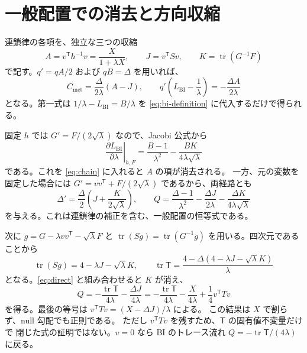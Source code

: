 \documentclass[11pt,a4paper]{article}
\newcommand{\tr}{\operatorname{tr}}
\newcommand{\Tmix}{\mathsf{T}}
\newcommand{\Cmet}{C_{\mathrm{met}}}
\newcommand{\Lbi}{L_{\mathrm{BI}}}
\begin{document}
\newpage
\section{一般配置での消去と方向収縮}
連鎖律の各項を、独立な三つの収縮
\begin{equation}\label{eq:contractions}
A=v^{\mathsf T}h^{-1}v=\frac{X}{1+\lambda X},\qquad
J=v^{\mathsf T}Sv,\qquad K=\tr(G^{-1}F)
\end{equation}
で記す。$q'=qA/2$ および $qB=\Delta$ を用いれば、
\begin{equation}\label{eq:metric-cancellation}
\Cmet=\frac{\Delta}{2\lambda}(A-J),\qquad
q'\left(\Lbi-\frac1\lambda\right)=-\frac{\Delta A}{2\lambda}
\end{equation}
となる。第一式は $1/\lambda-\Lbi=B/\lambda$ を
\eqref{eq:bi-definition} に代入するだけで得られる。

固定 $h$ では $G'=F/(2\sqrt\lambda)$ なので、Jacobi 公式から
\begin{equation}\label{eq:fixed-jacobi}
\left.\frac{\partial\Lbi}{\partial\lambda}\right|_{h,F}
=\frac{B-1}{\lambda^2}-\frac{BK}{4\lambda\sqrt\lambda}
\end{equation}
である。これを \eqref{eq:chain} に入れると $A$ の項が消去される。
一方、元の変数を固定した場合には
$G'=vv^{\mathsf T}+F/(2\sqrt\lambda)$ であるから、両経路とも
\begin{equation}\label{eq:direct}
\Delta'=\frac\Delta2\left(J+\frac{K}{2\sqrt\lambda}\right),
\qquad
Q=\frac{\Delta-1}{\lambda^2}-\frac{\Delta J}{2\lambda}
 -\frac{\Delta K}{4\lambda\sqrt\lambda}
\end{equation}
を与える。これは連鎖律の補正を含む、一般配置の恒等式である。

次に $g=G-\lambda vv^{\mathsf T}-\sqrt\lambda F$ と
$\tr(Sg)=\tr(G^{-1}g)$ を用いる。四次元であることから
\begin{equation}\label{eq:trace}
\tr(Sg)=4-\lambda J-\sqrt\lambda K,\qquad
\tr\Tmix=\frac{4-\Delta(4-\lambda J-\sqrt\lambda K)}{\lambda}
\end{equation}
となる。\eqref{eq:direct} と組み合わせると $K$ が消え、
\begin{equation}\label{eq:main}
\boxed{\displaystyle
Q=-\frac{\tr\Tmix}{4\lambda}-\frac{\Delta J}{4\lambda}
=-\frac{\tr\Tmix}{4\lambda}-\frac{X}{4\lambda}
 +\frac14v^{\mathsf T}Tv }
\end{equation}
を得る。最後の等号は $v^{\mathsf T}Tv=(X-\Delta J)/\lambda$ による。
この結果は $X$ で割らず、null 勾配でも正則である。
ただし $v^{\mathsf T}Tv$ を残すため、$\Tmix$ の固有値不変量だけで
閉じた式の証明ではない。$v=0$ なら BI のトレース流れ
$Q=-\tr\Tmix/(4\lambda)$ に戻る。
\end{document}

